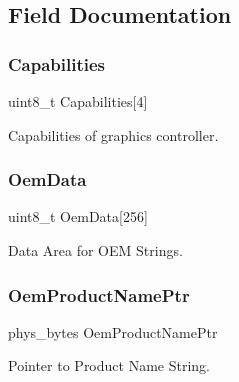 \subsection{Field Documentation}
\hypertarget{structvbe__info__block__t_a555521aede0ff448231fc7a404862bdb}{}\label{structvbe__info__block__t_a555521aede0ff448231fc7a404862bdb} 
\subsubsection{\texorpdfstring{Capabilities}{Capabilities}}
{\footnotesize\ttfamily uint8\+\_\+t Capabilities\mbox{[}4\mbox{]}}



Capabilities of graphics controller. 

\hypertarget{structvbe__info__block__t_a966ae75c33c2d65b4f0c916f093acac0}{}\label{structvbe__info__block__t_a966ae75c33c2d65b4f0c916f093acac0} 
\subsubsection{\texorpdfstring{Oem\+Data}{OemData}}
{\footnotesize\ttfamily uint8\+\_\+t Oem\+Data\mbox{[}256\mbox{]}}



Data Area for O\+EM Strings. 

\hypertarget{structvbe__info__block__t_afd3d28c2078a683b1ed64ea21905fcfe}{}\label{structvbe__info__block__t_afd3d28c2078a683b1ed64ea21905fcfe} 
\subsubsection{\texorpdfstring{Oem\+Product\+Name\+Ptr}{OemProductNamePtr}}
{\footnotesize\ttfamily phys\+\_\+bytes Oem\+Product\+Name\+Ptr}



Pointer to Product Name String. 

